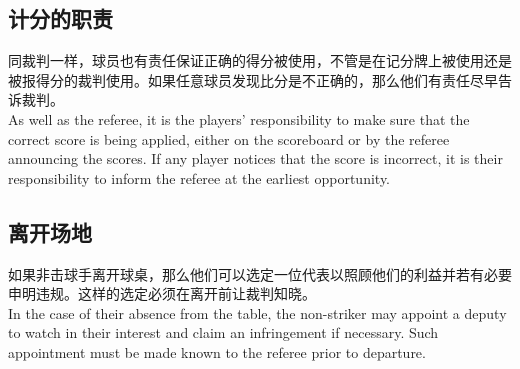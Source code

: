 \subsection{计分的职责}

\noindent 同裁判一样，球员也有责任保证正确的得分被使用，不管是在记分牌上被使用还是被报得分的裁判使用。如果任意球员发现比分是不正确的，那么他们有责任尽早告诉裁判。\\
As well as the referee, it is the players' responsibility to make sure that the correct score is being applied, either on the scoreboard or by the referee announcing the scores. If any player notices that the score is incorrect, it is their responsibility to inform the referee at the earliest opportunity.

\subsection{离开场地}

\noindent 如果非击球手离开球桌，那么他们可以选定一位代表以照顾他们的利益并若有必要申明违规。这样的选定必须在离开前让裁判知晓。\\
In the case of their absence from the table, the non-striker may appoint a deputy to watch in their interest and claim an infringement if necessary. Such appointment must be made known to the referee prior to departure.
